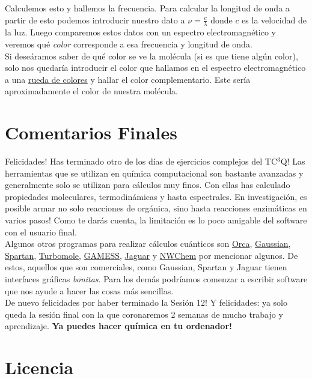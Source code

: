 \documentclass[10pt,letterpaper]{article}
\begin{document}
Calculemos esto y hallemos la frecuencia. Para calcular la longitud de onda a partir de esto podemos introducir nuestro dato a $\nu = \frac{c}{\lambda}$ donde $c$ es la velocidad de la luz. Luego comparemos estos datos con un espectro electromagn\'etico y veremos qu\'e \emph{color} corresponde a esa frecuencia y longitud de onda.\\

Si dese\'aramos saber de qu\'e color se ve la mol\'ecula (si es que tiene alg\'un color), solo nos quedar\'ia introducir el color que hallamos en el espectro electromagn\'etico a una \href{http://paletton.com/}{rueda de colores} y hallar el color complementario. Este ser\'ia aproximadamente el color de nuestra mol\'ecula.

\section{Comentarios Finales}
Felicidades! Has terminado otro de los d\'ias de ejercicios complejos del TC$^3$Q! Las herramientas que se utilizan en qu\'imica computacional son bastante avanzadas y generalmente solo se utilizan para c\'alculos muy finos. Con ellas has calculado propiedades moleculares, termodin\'amicas y hasta espectrales. En investigaci\'on, es posible armar no solo reacciones de org\'anica, sino hasta reacciones enzim\'aticas en varios pasos! Como te dar\'as cuenta, la limitaci\'on es lo poco amigable del software con el usuario final.\\

Algunos otros programas para realizar c\'alculos cu\'anticos son \href{https://orcaforum.cec.mpg.de/}{Orca}, \href{http://gaussian.com/}{Gaussian}, \href{https://www.wavefun.com/products/spartan.html}{Spartan}, \href{http://www.turbomole.com/}{Turbomole}, \href{http://www.msg.ameslab.gov/gamess/}{GAMESS}, \href{https://www.schrodinger.com/jaguar}{Jaguar} y \href{http://www.nwchem-sw.org/index.php/Main_Page}{NWChem} por mencionar algunos. De estos, aquellos que son comerciales, como Gaussian, Spartan y Jaguar tienen interfaces gr\'aficas \emph{bonitas}. Para los dem\'as podr\'iamos comenzar a escribir software que nos ayude a hacer las cosas m\'as sencillas.\\

De nuevo felicidades por haber terminado la Sesi\'on 12! Y felicidades: ya solo queda la sesi\'on final con la que coronaremos 2 semanas de mucho trabajo y aprendizaje. \textbf{Ya puedes hacer qu\'imica en tu ordenador!}


\section*{Licencia}
\end{document}
